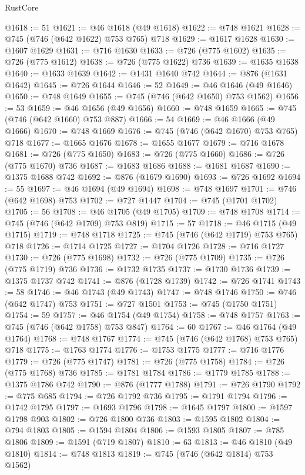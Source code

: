\begin{lexlean}{RustCore}
\begin{coremodule}
@1618 := 51
@1621 := @46 @1618 (@49 @1618)
@1622 := @748 @1621
@1628 := @745 (@746 (@642 @1622) @753 @765) @718
@1629 := @1617 @1628
@1630 := @1607 @1629
@1631 := @716 @1630
@1633 := @726 (@775 @1602)
@1635 := @726 (@775 @1612)
@1638 := @726 (@775 @1622) @736
@1639 := @1635 @1638
@1640 := @1633 @1639
@1642 := @1431 @1640 @742
@1644 := @876 (@1631 @1642)
@1645 := @726 @1644
@1646 := 52
@1649 := @46 @1646 (@49 @1646)
@1650 := @748 @1649
@1655 := @745 (@746 (@642 @1650) @753 @1562)
@1656 := 53
@1659 := @46 @1656 (@49 @1656)
@1660 := @748 @1659
@1665 := @745 (@746 (@642 @1660) @753 @887)
@1666 := 54
@1669 := @46 @1666 (@49 @1666)
@1670 := @748 @1669
@1676 := @745 (@746 (@642 @1670) @753 @765) @718
@1677 := @1665 @1676
@1678 := @1655 @1677
@1679 := @716 @1678
@1681 := @726 (@775 @1650)
@1683 := @726 (@775 @1660)
@1686 := @726 (@775 @1670) @736
@1687 := @1683 @1686
@1688 := @1681 @1687
@1690 := @1375 @1688 @742
@1692 := @876 (@1679 @1690)
@1693 := @726 @1692
@1694 := 55
@1697 := @46 @1694 (@49 @1694)
@1698 := @748 @1697
@1701 := @746 (@642 @1698) @753
@1702 := @727 @1447
@1704 := @745 (@1701 @1702)
@1705 := 56
@1708 := @46 @1705 (@49 @1705)
@1709 := @748 @1708
@1714 := @745 (@746 (@642 @1709) @753 @819)
@1715 := 57
@1718 := @46 @1715 (@49 @1715)
@1719 := @748 @1718
@1725 := @745 (@746 (@642 @1719) @753 @765) @718
@1726 := @1714 @1725
@1727 := @1704 @1726
@1728 := @716 @1727
@1730 := @726 (@775 @1698)
@1732 := @726 (@775 @1709)
@1735 := @726 (@775 @1719) @736
@1736 := @1732 @1735
@1737 := @1730 @1736
@1739 := @1375 @1737 @742
@1741 := @876 (@1728 @1739)
@1742 := @726 @1741
@1743 := 58
@1746 := @46 @1743 (@49 @1743)
@1747 := @748 @1746
@1750 := @746 (@642 @1747) @753
@1751 := @727 @1501
@1753 := @745 (@1750 @1751)
@1754 := 59
@1757 := @46 @1754 (@49 @1754)
@1758 := @748 @1757
@1763 := @745 (@746 (@642 @1758) @753 @847)
@1764 := 60
@1767 := @46 @1764 (@49 @1764)
@1768 := @748 @1767
@1774 := @745 (@746 (@642 @1768) @753 @765) @718
@1775 := @1763 @1774
@1776 := @1753 @1775
@1777 := @716 @1776
@1779 := @726 (@775 @1747)
@1781 := @726 (@775 @1758)
@1784 := @726 (@775 @1768) @736
@1785 := @1781 @1784
@1786 := @1779 @1785
@1788 := @1375 @1786 @742
@1790 := @876 (@1777 @1788)
@1791 := @726 @1790
@1792 := @775 @685
@1794 := @726 @1792 @736
@1795 := @1791 @1794
@1796 := @1742 @1795
@1797 := @1693 @1796
@1798 := @1645 @1797
@1800 := @1597 @1798 @903
@1802 := @726 @1800 @736
@1803 := @1595 @1802
@1804 := @794 @1803
@1805 := @1594 @1804
@1806 := @1593 @1805
@1807 := @785 @1806
@1809 := @1591 (@719 @1807)
@1810 := 63
@1813 := @46 @1810 (@49 @1810)
@1814 := @748 @1813
@1819 := @745 (@746 (@642 @1814) @753 @1562)

\end{coremodule}
\end{lexlean}
